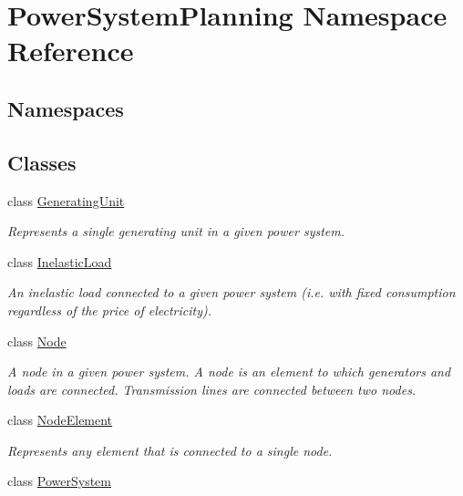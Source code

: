 \hypertarget{namespace_power_system_planning}{}\section{Power\+System\+Planning Namespace Reference}
\label{namespace_power_system_planning}
\subsection*{Namespaces}
\begin{DoxyCompactItemize}
\end{DoxyCompactItemize}
\subsection*{Classes}
\begin{DoxyCompactItemize}
\item 
class \hyperlink{class_power_system_planning_1_1_generating_unit}{Generating\+Unit}
\begin{DoxyCompactList}\small\item\em Represents a single generating unit in a given power system. \end{DoxyCompactList}\item 
class \hyperlink{class_power_system_planning_1_1_inelastic_load}{Inelastic\+Load}
\begin{DoxyCompactList}\small\item\em An inelastic load connected to a given power system (i.\+e. with fixed consumption regardless of the price of electricity). \end{DoxyCompactList}\item 
class \hyperlink{class_power_system_planning_1_1_node}{Node}
\begin{DoxyCompactList}\small\item\em A node in a given power system. A node is an element to which generators and loads are connected. Transmission lines are connected between two nodes. \end{DoxyCompactList}\item 
class \hyperlink{class_power_system_planning_1_1_node_element}{Node\+Element}
\begin{DoxyCompactList}\small\item\em Represents any element that is connected to a single node. \end{DoxyCompactList}\item 
class \hyperlink{class_power_system_planning_1_1_power_system}{Power\+System}

\end{DoxyCompactItemize}
